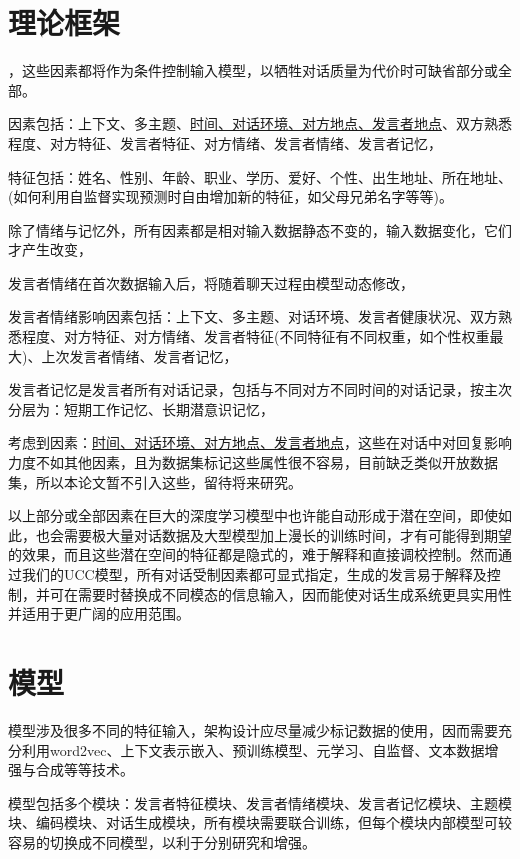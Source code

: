 \documentclass[letterpaper]{article} %
\newcommand{\KModelName}{UCC模型}
\newcommand{\KFactorNoused}{\underline{时间、对话环境、对方地点、发言者地点}}
\begin{document}
\begin{CJK*}{UTF8}{gbsn}
\section{理论框架}

，这些因素都将作为条件控制输入模型，以牺牲对话质量为代价时可缺省部分或全部。

因素包括：上下文、多主题、\KFactorNoused、双方熟悉程度、对方特征、发言者特征、对方情绪、发言者情绪、发言者记忆，

特征包括：姓名、性别、年龄、职业、学历、爱好、个性、出生地址、所在地址、(如何利用自监督实现预测时自由增加新的特征，如父母兄弟名字等等)。

除了情绪与记忆外，所有因素都是相对输入数据静态不变的，输入数据变化，它们才产生改变，

发言者情绪在首次数据输入后，将随着聊天过程由模型动态修改，

发言者情绪影响因素包括：上下文、多主题、对话环境、发言者健康状况、双方熟悉程度、对方特征、对方情绪、发言者特征(不同特征有不同权重，如个性权重最大)、上次发言者情绪、发言者记忆，

发言者记忆是发言者所有对话记录，包括与不同对方不同时间的对话记录，按主次分层为：短期工作记忆、长期潜意识记忆，

考虑到因素：\KFactorNoused，这些在对话中对回复影响力度不如其他因素，且为数据集标记这些属性很不容易，目前缺乏类似开放数据集，所以本论文暂不引入这些，留待将来研究。

以上部分或全部因素在巨大的深度学习模型中也许能自动形成于潜在空间，即使如此，也会需要极大量对话数据及大型模型加上漫长的训练时间，才有可能得到期望的效果，而且这些潜在空间的特征都是隐式的，难于解释和直接调校控制。然而通过我们的\KModelName，所有对话受制因素都可显式指定，生成的发言易于解释及控制，并可在需要时替换成不同模态的信息输入，因而能使对话生成系统更具实用性并适用于更广阔的应用范围。

\section{模型}
模型涉及很多不同的特征输入，架构设计应尽量减少标记数据的使用，因而需要充分利用word2vec、上下文表示嵌入、预训练模型、元学习、自监督、文本数据增强与合成等等技术。

模型包括多个模块：发言者特征模块、发言者情绪模块、发言者记忆模块、主题模块、编码模块、对话生成模块，所有模块需要联合训练，但每个模块内部模型可较容易的切换成不同模型，以利于分别研究和增强。



\end{CJK*}
\end{document}
